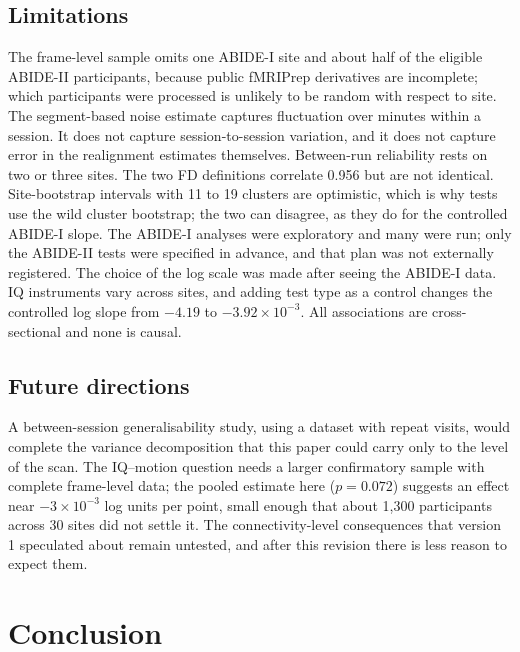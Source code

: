 \documentclass[11pt,a4paper]{article}
\begin{document}
\subsection{Limitations}

The frame-level sample omits one ABIDE-I site and about half of the eligible ABIDE-II participants, because public fMRIPrep derivatives are incomplete; which participants were processed is unlikely to be random with respect to site. The segment-based noise estimate captures fluctuation over minutes within a session. It does not capture session-to-session variation, and it does not capture error in the realignment estimates themselves. Between-run reliability rests on two or three sites. The two FD definitions correlate 0.956 but are not identical. Site-bootstrap intervals with 11 to 19 clusters are optimistic, which is why tests use the wild cluster bootstrap; the two can disagree, as they do for the controlled ABIDE-I slope. The ABIDE-I analyses were exploratory and many were run; only the ABIDE-II tests were specified in advance, and that plan was not externally registered. The choice of the log scale was made after seeing the ABIDE-I data. IQ instruments vary across sites, and adding test type as a control changes the controlled log slope from $-4.19$ to $-3.92 \times 10^{-3}$. All associations are cross-sectional and none is causal.

\subsection{Future directions}

A between-session generalisability study, using a dataset with repeat visits, would complete the variance decomposition that this paper could carry only to the level of the scan. The IQ--motion question needs a larger confirmatory sample with complete frame-level data; the pooled estimate here ($p = 0.072$) suggests an effect near $-3 \times 10^{-3}$ log units per point, small enough that about 1,300 participants across 30 sites did not settle it. The connectivity-level consequences that version 1 speculated about remain untested, and after this revision there is less reason to expect them.

\section{Conclusion}
\end{document}
